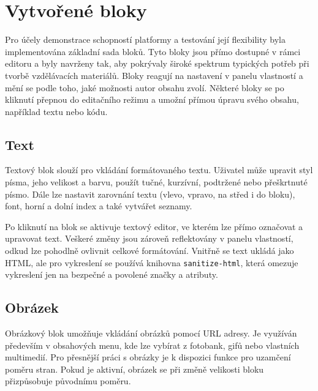 

\section{Vytvořené bloky}\label{text:realizace/vytvoreneBloky}

Pro účely demonstrace schopností platformy a testování její flexibility byla implementována základní sada bloků.
Tyto bloky jsou přímo dostupné v rámci editoru a byly navrženy tak, aby pokrývaly široké spektrum typických potřeb při tvorbě vzdělávacích materiálů. 
Bloky reagují na nastavení v panelu vlastností a mění se podle toho, jaké možnosti autor obsahu zvolí. 
Některé bloky se po kliknutí přepnou do editačního režimu a umožní přímou úpravu svého obsahu, například textu nebo kódu. 

\subsection{Text}

Textový blok slouží pro vkládání formátovaného textu. 
Uživatel může upravit styl písma, jeho velikost a barvu, použít tučné, kurzívní, podtržené nebo přeškrtnuté písmo. 
Dále lze nastavit zarovnání textu (vlevo, vpravo, na střed i do bloku), font, horní a dolní index a také vytvářet seznamy. 

Po kliknutí na blok se aktivuje textový editor, ve kterém lze přímo označovat a upravovat text. 
Veškeré změny jsou zároveň reflektovány v panelu vlastností, odkud lze pohodlně ovlivnit celkové formátování. 
Vnitřně se text ukládá jako HTML, ale pro vykreslení se používá knihovna \texttt{sanitize-html}, která omezuje vykreslení jen na bezpečné a povolené značky a atributy.

\subsection{Obrázek}

Obrázkový blok umožňuje vkládání obrázků pomocí URL adresy. 
Je využíván především v obsahových menu, kde lze vybírat z fotobank, gifů nebo vlastních multimedií. 
Pro přesnější práci s obrázky je k dispozici funkce pro uzamčení poměru stran. 
Pokud je aktivní, obrázek se při změně velikosti bloku přizpůsobuje původnímu poměru. 

